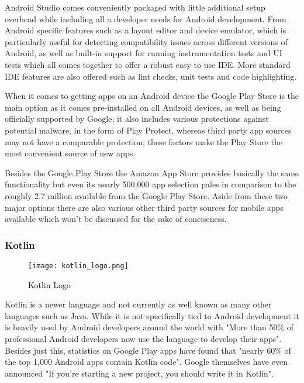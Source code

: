 Android Studio comes conveniently packaged with little additional setup overhead while including all a developer needs for Android development. From Android specific features such as a layout editor and device emulator, which is particularly useful for detecting compatibility issues across different versions of Android, as well as built-in support for running instrumentation tests and UI tests which all comes together to offer a robust easy to use IDE. More standard IDE features are also offered such as lint checks, unit tests and code highlighting.

When it comes to getting apps on an Android device the Google Play Store is the main option as it comes pre-installed on all Android devices, as well as being officially supported by Google, it also includes various protections against potential malware, in the form of Play Protect, whereas third party app sources may not have a comparable protection, these factors make the Play Store the most convenient source of new apps. 

Besides the Google Play Store the Amazon App Store provides basically the same functionality but even its nearly 500,000 app selection\cite{amazonappstoreappcount} pales in comparison to the roughly 2.7 million available from the Google Play Store\cite{playstoreappcount}. Aside from these two major options there are also various other third party sources for mobile apps available which won't be discussed for the sake of conciseness.

\subsubsection{Kotlin}

\begin{figure}[ht]
  \centering
      \texttt{[image: kotlin\_logo.png]}
  \caption[Kotlin Logo]{Kotlin Logo\cite{kotlinlogoresource}}
  \label{fig:kotlinlogo}
\end{figure}

Kotlin is a newer language and not currently as well known as many other languages such as Java. While it is not specifically tied to Android development it is heavily used by Android developers around the world with "More than 50\% of professional Android developers now use the language to develop their apps"\cite{googlekotlinfirstref}. Besides just this, statistics on Google Play apps have found that "nearly 60\% of the top 1,000 Android apps contain Kotlin code"\cite{60percentkotlinref}. Google themselves have even announced "If you’re starting a new project, you should write it in Kotlin"\cite{googlekotlinfirstref}\cite{androidkotlindevbookkotlinfirst}.

